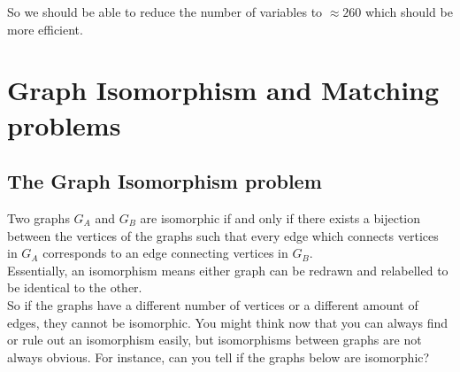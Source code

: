 \documentclass{article}
\begin{document}
\noindent So we should be able to reduce the number of variables to \(\approx 260\) which should be more efficient. 

\section{Graph Isomorphism and Matching problems}
\subsection{The Graph Isomorphism problem}
Two graphs \(G_A\) and \(G_B\) are isomorphic if and only if there exists a bijection between the vertices of the graphs such that every edge which connects vertices in \(G_A\) corresponds to an edge connecting vertices in \(G_B\). \\
Essentially, an isomorphism means either graph can be redrawn and relabelled to be identical to the other. \\

\noindent So if the graphs have a different number of vertices or a different amount of edges, they cannot be isomorphic. You might think now that you can always find or rule out an isomorphism easily, but isomorphisms between graphs are not always obvious. For instance, can you tell if the graphs below are isomorphic?\\
\end{document}
